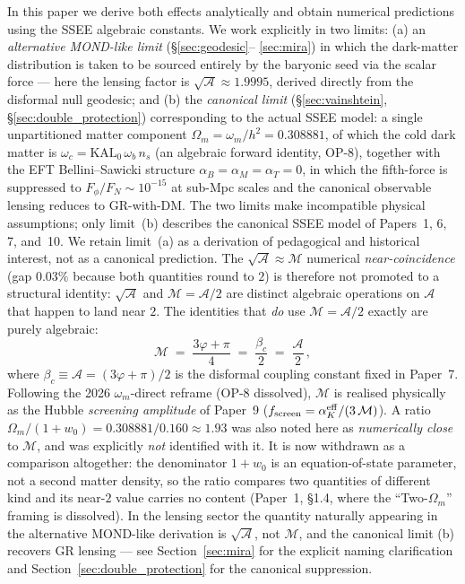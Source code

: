 \documentclass[12pt,a4paper]{article}
\newcommand{\phiG}{\varphi}
\newcommand{\MIRA}{\mathcal{M}}
\newcommand{\AURA}{\mathcal{A}}
\newcommand{\bc}{\beta_c}
\begin{document}
In this paper we derive both effects analytically and obtain numerical
predictions using the SSEE algebraic constants. We work explicitly in two
limits: (a) an \emph{alternative MOND-like limit} (\S\ref{sec:geodesic}--
\ref{sec:mira}) in which the dark-matter distribution is taken to be sourced
entirely by the baryonic seed via the scalar force — here the lensing factor
is $\sqrt{\AURA}\approx 1.9995$, derived directly from the disformal null
geodesic; and (b) the \emph{canonical limit}
(\S\ref{sec:vainshtein}, \S\ref{sec:double_protection}) corresponding to the
actual SSEE model: a single unpartitioned matter component
$\Omega_m=\omega_m/h^2=0.308881$, of which the cold dark matter is
$\omega_c=\mathrm{KAL}_0\,\omega_b\,n_s$ (an algebraic forward identity,
OP-8), together with the EFT
Bellini--Sawicki structure $\alpha_B=\alpha_M=\alpha_T=0$, in which the
fifth-force is suppressed to $F_\phi/F_N\sim 10^{-15}$ at sub-Mpc scales and
the canonical observable lensing reduces to GR-with-DM.
The two limits make incompatible physical assumptions; only limit~(b)
describes the canonical SSEE model of Papers~1, 6, 7, and~10. We retain
limit~(a) as a derivation of pedagogical and historical interest, not as a
canonical prediction. The $\sqrt{\AURA}\approx \MIRA$ numerical
\emph{near-coincidence} (gap $0.03\%$ because both quantities round to $2$)
is therefore not promoted to a structural identity:
$\sqrt{\AURA}$ and $\MIRA=\AURA/2$ are distinct algebraic operations on
$\AURA$ that happen to land near $2$.
The identities that \emph{do} use $\MIRA = \AURA/2$ exactly are purely algebraic:
\begin{equation}
  \MIRA \;=\; \frac{3\phiG + \pi}{4} \;=\; \frac{\bc}{2} \;=\; \frac{\AURA}{2}\,,
  \label{eq:mira_def}
\end{equation}
where $\bc \equiv \AURA = (3\phiG+\pi)/2$ is the disformal coupling
constant fixed in Paper~7. Following the 2026 $\omega_m$-direct reframe
(OP-8 dissolved), $\MIRA$ is realised physically as the Hubble \emph{screening
amplitude} of Paper~9 ($f_{\rm screen}=\alpha_K^{\rm eff}/(3\,\MIRA)$). A ratio
$\Omega_m/(1+w_0)=0.308881/0.160\approx1.93$ was also noted here as
\emph{numerically close} to $\MIRA$, and was explicitly \emph{not} identified
with it. It is now withdrawn as a comparison altogether: the denominator
$1+w_0$ is an equation-of-state parameter, not a second matter density, so the
ratio compares two quantities of different kind and its near-$2$ value carries
no content (Paper~1, \S1.4, where the ``Two-$\Omega_m$'' framing is
dissolved). In the lensing sector the quantity
naturally appearing in the alternative MOND-like derivation is
$\sqrt{\AURA}$, not $\MIRA$, and the canonical limit (b) recovers GR
lensing — see Section~\ref{sec:mira} for the explicit naming clarification
and Section~\ref{sec:double_protection} for the canonical suppression.
\end{document}
